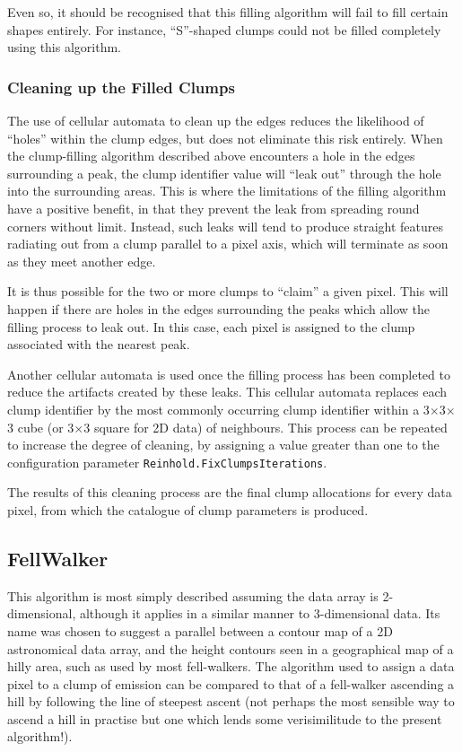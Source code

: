 \documentclass[twoside,11pt]{article}
\newcommand{\xlabel}[1]{}
\renewcommand{\_}{\texttt{\symbol{95}}}
\begin{document}
Even so, it should be recognised that this filling algorithm will fail to
fill certain shapes entirely. For instance, ``S''-shaped clumps could not
be filled completely using this algorithm.

\subsubsection{Cleaning up the Filled Clumps}
The use of cellular automata to clean up the edges reduces the likelihood
of ``holes'' within the clump edges, but does not eliminate this risk
entirely. When the clump-filling algorithm described above encounters a
hole in the edges surrounding a peak, the clump identifier value will
``leak out'' through the hole into the surrounding areas. This is where the
limitations of the filling algorithm have a positive benefit, in that they
prevent the leak from spreading round corners without limit. Instead, such
leaks will tend to produce straight features radiating out from a clump
parallel to a pixel axis, which will terminate as soon as they meet another
edge.

It is thus possible for the two or more clumps to ``claim'' a given
pixel. This will happen if there are holes in the edges surrounding the
peaks which allow the filling process to leak out. In this case, each
pixel is assigned to the clump associated with the nearest peak.

Another cellular automata is used once the filling process has been
completed to reduce the artifacts created by these leaks. This cellular
automata replaces each clump identifier by the most commonly occurring
clump identifier within a 3$\times$3$\times$3 cube (or 3$\times$3 square
for 2D data) of
neighbours. This process can be repeated to increase the degree of
cleaning, by assigning a value greater than one to the configuration
parameter {\tt Reinhold.FixClumpsIterations}.

The results of this cleaning process are the final clump allocations for
every data pixel, from which the catalogue of clump parameters is produced.

\subsection{\xlabel{fellwalker}FellWalker}
This algorithm is most simply described assuming the data array is
2-dimensional, although it applies in a similar manner to 3-dimensional
data. Its name was chosen to suggest a parallel between a contour map of
a 2D astronomical data array, and the height contours seen in a geographical
map of a hilly area, such as used by most fell-walkers. The algorithm
used to assign a data pixel to a clump of emission can be compared to
that of a fell-walker ascending a hill by following the line of steepest
ascent (not perhaps the most sensible way to ascend a hill in practise
but one which lends some verisimilitude to the present algorithm!).
\end{document}
